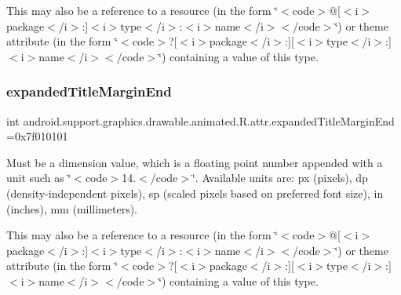 This may also be a reference to a resource (in the form \char`\"{}$<$code$>$@\mbox{[}$<$i$>$package$<$/i$>$\+:\mbox{]}$<$i$>$type$<$/i$>$\+:$<$i$>$name$<$/i$>$$<$/code$>$\char`\"{}) or theme attribute (in the form \char`\"{}$<$code$>$?\mbox{[}$<$i$>$package$<$/i$>$\+:\mbox{]}\mbox{[}$<$i$>$type$<$/i$>$\+:\mbox{]}$<$i$>$name$<$/i$>$$<$/code$>$\char`\"{}) containing a value of this type. \mbox{\label{classandroid_1_1support_1_1graphics_1_1drawable_1_1animated_1_1R_1_1attr_a50ab70cb95fc2a5a2be027c83ceadc72}} 
\subsubsection{\texorpdfstring{expanded\+Title\+Margin\+End}{expandedTitleMarginEnd}}
{\footnotesize\ttfamily int android.\+support.\+graphics.\+drawable.\+animated.\+R.\+attr.\+expanded\+Title\+Margin\+End =0x7f010101\hspace{0.3cm}{\ttfamily [static]}}

Must be a dimension value, which is a floating point number appended with a unit such as \char`\"{}$<$code$>$14.\+5sp$<$/code$>$\char`\"{}. Available units are\+: px (pixels), dp (density-\/independent pixels), sp (scaled pixels based on preferred font size), in (inches), mm (millimeters). 

This may also be a reference to a resource (in the form \char`\"{}$<$code$>$@\mbox{[}$<$i$>$package$<$/i$>$\+:\mbox{]}$<$i$>$type$<$/i$>$\+:$<$i$>$name$<$/i$>$$<$/code$>$\char`\"{}) or theme attribute (in the form \char`\"{}$<$code$>$?\mbox{[}$<$i$>$package$<$/i$>$\+:\mbox{]}\mbox{[}$<$i$>$type$<$/i$>$\+:\mbox{]}$<$i$>$name$<$/i$>$$<$/code$>$\char`\"{}) containing a value of this type. \mbox{\label{classandroid_1_1support_1_1graphics_1_1drawable_1_1animated_1_1R_1_1attr_a7b1777de2db6ecf22f48a9c15397db90}} 
